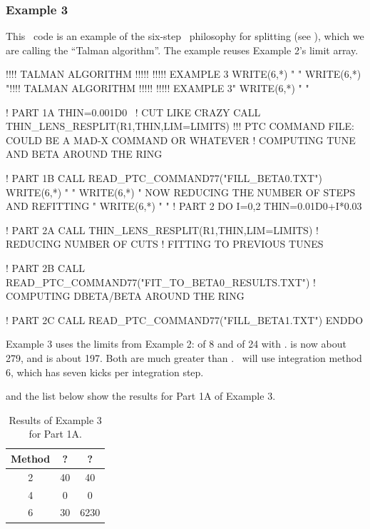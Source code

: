 \subsubsection*{Example 3}

%
This \PTC\ code is an example of the six-step \PTC\ philosophy for splitting
(see ), which we are calling the ``Talman algorithm''.
The example reuses Example 2's limit array.


\begin{ptccode}
!!!! TALMAN ALGORITHM !!!!! !!!!!  EXAMPLE 3
WRITE(6,*) "  "
WRITE(6,*) "!!!! TALMAN ALGORITHM !!!!! !!!!!  EXAMPLE 3"
WRITE(6,*) "  "

! PART 1A
THIN=0.001D0  ~! CUT LIKE CRAZY
CALL THIN_LENS_RESPLIT(R1,THIN,LIM=LIMITS)
!!! PTC COMMAND FILE: COULD BE A MAD-X COMMAND OR WHATEVER
! COMPUTING TUNE AND BETA AROUND THE RING

! PART 1B
CALL READ_PTC_COMMAND77("FILL_BETA0.TXT")
WRITE(6,*) "  "
WRITE(6,*) " NOW REDUCING THE NUMBER OF STEPS AND REFITTING "
WRITE(6,*) "  "
! PART 2
DO I=0,2
THIN=0.01D0+I*0.03

! PART 2A
CALL THIN_LENS_RESPLIT(R1,THIN,LIM=LIMITS) ! REDUCING NUMBER OF CUTS
! FITTING TO PREVIOUS TUNES

! PART 2B
CALL READ_PTC_COMMAND77("FIT_TO_BETA0_RESULTS.TXT")
! COMPUTING DBETA/BETA AROUND THE RING

! PART 2C
CALL READ_PTC_COMMAND77("FILL_BETA1.TXT")
ENDDO
\end{ptccode}

Example 3 uses the limits from Example 2:  of 8 and  of 24 with
.  is now about 279, and  is about 197.
Both are much greater than . \PTC\ will use integration method 6, which has 
seven kicks per integration step.

 and the list below show the results for Part 1A of Example 3.

\begin{table}[htdp]
\caption{Results of Example 3 for Part 1A.}
\label{tbl:Results-Example-3}
\begin{center}
\begin{tabular}{ccc} \toprule
  Method & ?  & ? \\ \midrule
    2    & 40 & 40 \\
    4    &  0 &  0 \\
    6    & 30 & 6230 \\ \bottomrule
\end{tabular}
\end{center}
\end{table}

